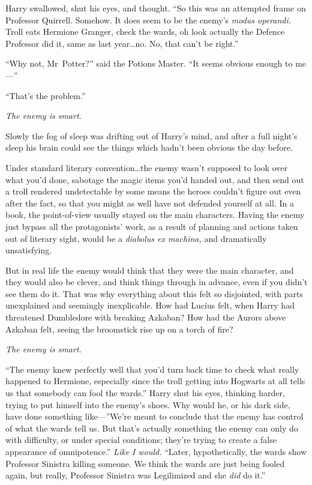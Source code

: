 Harry swallowed, shut his eyes, and thought. “So this was an attempted frame on Professor Quirrell. Somehow. It does seem to be the enemy’s \emph{modus operandi.} Troll eats Hermione Granger, check the wards, oh look actually the Defence Professor did it, same as last year…no. No, that can’t be right.”

“Why not, Mr~Potter?” said the Potions Master. “It seems obvious enough to me—”

“That’s the problem.”

\emph{The enemy is smart.}

Slowly the fog of sleep was drifting out of Harry’s mind, and after a full night’s sleep his brain could see the things which hadn’t been obvious the day before.

Under standard literary convention…the enemy wasn’t supposed to look over what you’d done, sabotage the magic items you’d handed out, and then send out a troll rendered undetectable by some means the heroes couldn’t figure out even after the fact, so that you might as well have not defended yourself at all. In a book, the point-of-view usually stayed on the main characters. Having the enemy just bypass all the protagonists’ work, as a result of planning and actions taken out of literary sight, would be a \emph{diabolus ex machina,} and dramatically unsatisfying.

But in real life the enemy would think that they were the main character, and they would also be clever, and think things through in advance, even if you didn’t see them do it. That was why everything about this felt so disjointed, with parts unexplained and seemingly inexplicable. How had Lucius felt, when Harry had threatened Dumbledore with breaking Azkaban? How had the Aurors above Azkaban felt, seeing the broomstick rise up on a torch of fire?

\emph{The enemy is smart.}

“The enemy knew perfectly well that you’d turn back time to check what really happened to Hermione, especially since the troll getting into Hogwarts at all tells us that somebody can fool the wards.” Harry shut his eyes, thinking harder, trying to put himself into the enemy’s shoes. Why would he, or his dark side, have done something like—”We’re meant to conclude that the enemy has control of what the wards tell us. But that’s actually something the enemy can only do with difficulty, or under special conditions; they’re trying to create a false appearance of omnipotence.” \emph{Like I would.} “Later, hypothetically, the wards show Professor Sinistra killing someone. We think the wards are just being fooled again, but really, Professor Sinistra was Legilimized and she \emph{did} do it.”

